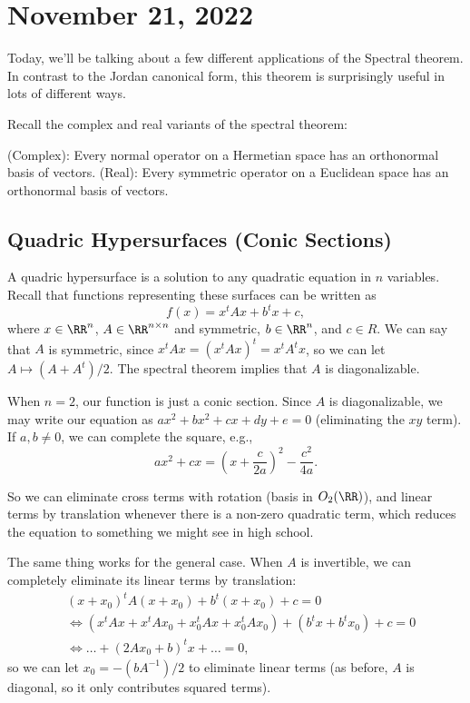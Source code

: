\section{November 21, 2022}

Today, we'll be talking about a few different applications of the Spectral theorem. In contrast to the Jordan canonical form, this theorem is surprisingly useful in lots of different ways. 

Recall the complex and real variants of the spectral theorem: 

\begin{theorem}

(Complex): Every normal operator on a Hermetian space has an orthonormal basis of vectors. (Real): Every symmetric operator on a Euclidean space has an orthonormal basis of vectors.
\end{theorem}

\subsection{Quadric Hypersurfaces (Conic Sections)}

A \ac{quadric hypersurface} is a solution to any quadratic equation in $n$ variables. Recall that functions representing these surfaces can be written as
\[f(x) = x^tAx+b^tx+c,\]
where $x\in \RR^n$, $A\in \RR^{n\times n}$ and symmetric, $b\in \RR^n$, and $c\in R$. We can say that $A$ is symmetric, since $x^tAx = (x^tAx)^t = x^tA^tx$, so we can let $A\mapsto (A+A^t)/2$. The spectral theorem implies that $A$ is diagonalizable. 

When $n=2$, our function is just a conic section. Since $A$ is diagonalizable, we may write our equation as $ax^2+bx^2+cx+dy+e=0$ (eliminating the $xy$ term). If $a,b\neq 0$, we can complete the square, e.g.,
\[ax^2+cx = \left(x+\frac{c}{2a}\right)^2-\frac{c^2}{4a}.\]

So we can eliminate cross terms with rotation (basis in $O_2(\RR)$), and linear terms by translation whenever there is a non-zero quadratic term, which reduces the equation to something we might see in high school. 

The same thing works for the general case. When $A$ is invertible, we can completely eliminate its linear terms by translation: 
\begin{align*}
    &(x+x_0)^tA(x+x_0) + b^t(x+x_0)+c=0 \\
    &\iff (x^tAx+x^tAx_0+x_0^tAx+x_0^tAx_0)+(b^tx+b^tx_0)+c=0 \\
    &\iff \hdots + (2Ax_0+b)^tx + \hdots = 0,
\end{align*}
so we can let $x_0 = -(bA^{-1})/2$ to eliminate linear terms (as before, $A$ is diagonal, so it only contributes squared terms).


